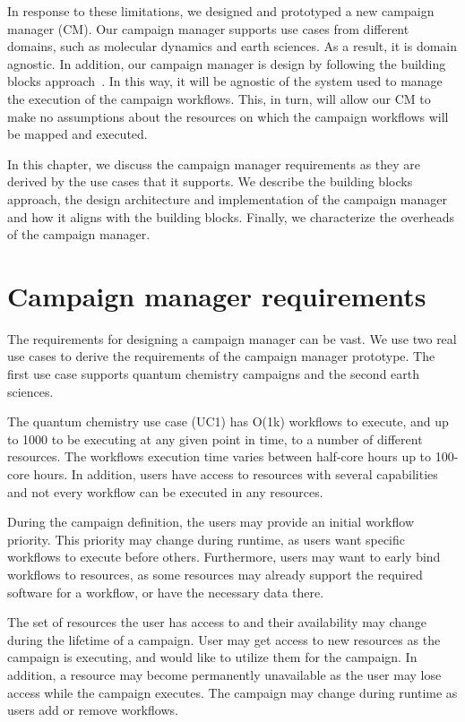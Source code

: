 In response to these limitations, we designed and prototyped a new campaign manager (CM).
Our campaign manager supports use cases from different domains, such as molecular dynamics and earth sciences.
As a result, it is domain agnostic.
In addition, our campaign manager is design by following the building blocks approach~\cite{turilli2019middleware}.
In this way, it will be agnostic of the system used to manage the execution of the campaign workflows.
This, in turn, will allow our CM to make no assumptions about the resources on which the campaign workflows will be mapped and executed.

In this chapter, we discuss the campaign manager requirements as they are derived by the use cases that it supports.
We describe the building blocks approach, the design architecture and implementation of the campaign manager and how it aligns with the building blocks.
Finally, we characterize the overheads of the campaign manager.

\section{Campaign manager requirements}
The requirements for designing a campaign manager can be vast.
We use two real use cases to derive the requirements of the campaign manager prototype.
The first use case supports quantum chemistry campaigns and the second earth sciences.

The quantum chemistry use case (UC1) has O(1k) workflows to execute, and up to 1000 to be executing at any given point in time, to a number of different resources. 
The workflows execution time varies between half-core hours up to 100-core hours.
In addition, users have access to resources with several capabilities and not every workflow can be executed in any resources. 

During the campaign definition, the users may provide an initial workflow priority.
This priority may change during runtime, as users want specific workflows to execute before others.
Furthermore, users may want to early bind workflows to resources, as some resources may already support the required software for a workflow, or have the necessary data there.

The set of resources the user has access to and their availability may change during the lifetime of a campaign.
User may get access to new resources as the campaign is executing, and would like to utilize them for the campaign.
In addition, a resource may become permanently unavailable as the user may lose access while the campaign executes.
The campaign may change during runtime as users add or remove workflows.

